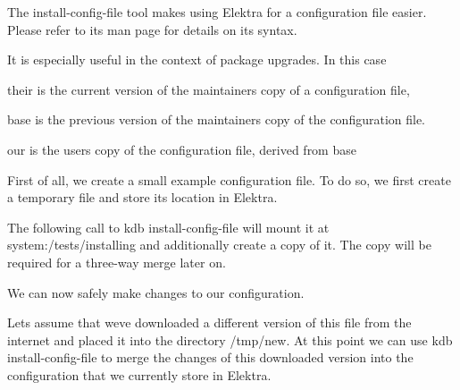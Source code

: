 \label{doc_tutorials_install-config-files_md_md_doc_tutorials_install_config_files}%
%
 The {\ttfamily install-\/config-\/file} tool makes using Elektra for a configuration file easier. Please refer to its man page for details on its syntax.

It is especially useful in the context of package upgrades. In this case


\begin{DoxyItemize}
\item {\ttfamily their} is the current version of the maintainer\textquotesingle{}s copy of a configuration file,
\item {\ttfamily base} is the previous version of the maintainer\textquotesingle{}s copy of the configuration file.
\item {\ttfamily our} is the user\textquotesingle{}s copy of the configuration file, derived from {\ttfamily base}
\end{DoxyItemize}

First of all, we create a small example configuration file. To do so, we first create a temporary file and store its location in Elektra.


\begin{DoxyCode}{0}

\end{DoxyCode}


The following call to {\ttfamily kdb install-\/config-\/file} will mount it at {\ttfamily system\+:/tests/installing} and additionally create a copy of it. The copy will be required for a three-\/way merge later on.


\begin{DoxyCode}{0}

\end{DoxyCode}


We can now safely make changes to our configuration.


\begin{DoxyCode}{0}

\end{DoxyCode}


Let\textquotesingle{}s assume that we\textquotesingle{}ve downloaded a different version of this file from the internet and placed it into the directory {\ttfamily /tmp/new}. At this point we can use {\ttfamily kdb install-\/config-\/file} to merge the changes of this downloaded version into the configuration that we currently store in Elektra.

